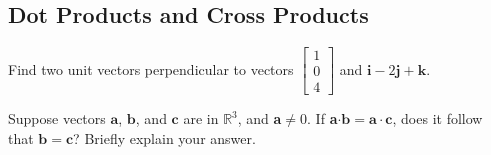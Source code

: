 \subsection{Dot Products and Cross Products}


\BEN 

\item %
Find two unit vectors perpendicular to vectors $\begin{bmatrix} 1 \\ 0\\4 \end{bmatrix}$ and $\mathbf{i}-2\mathbf{j}+\mathbf{k}$. 
\item 
Suppose vectors $\mathbf{a}$, $\mathbf{b}$, and $\mathbf{c}$ are in $\mathbb{R}^3$, and \textbf{a}$\ne 0$. If \textbf{a}$\cdot\mathbf{b}=\mathbf{a}\cdot\mathbf{c}$, does it follow that $\mathbf{b}=\mathbf{c}$? Briefly explain your answer. 

